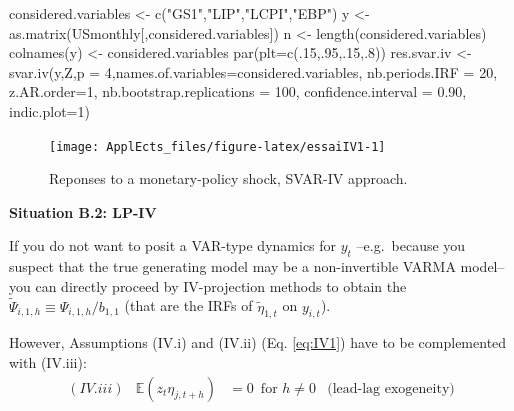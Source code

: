 \documentclass[
  12pt,
]{book}
\newenvironment{Shaded}{\begin{snugshade}}{\end{snugshade}}
\newcommand{\AttributeTok}[1]{\textcolor[rgb]{0.77,0.63,0.00}{#1}}
\newcommand{\DecValTok}[1]{\textcolor[rgb]{0.00,0.00,0.81}{#1}}
\newcommand{\FloatTok}[1]{\textcolor[rgb]{0.00,0.00,0.81}{#1}}
\newcommand{\FunctionTok}[1]{\textcolor[rgb]{0.00,0.00,0.00}{#1}}
\newcommand{\NormalTok}[1]{#1}
\newcommand{\OtherTok}[1]{\textcolor[rgb]{0.56,0.35,0.01}{#1}}
\newcommand{\StringTok}[1]{\textcolor[rgb]{0.31,0.60,0.02}{#1}}
\theoremstyle{definition}
\theoremstyle{definition}
\theoremstyle{definition}
\theoremstyle{definition}
\theoremstyle{remark}
\begin{document}
\begin{Shaded}
\begin{Highlighting}[]
\NormalTok{considered.variables }\OtherTok{\textless{}{-}} \FunctionTok{c}\NormalTok{(}\StringTok{"GS1"}\NormalTok{,}\StringTok{"LIP"}\NormalTok{,}\StringTok{"LCPI"}\NormalTok{,}\StringTok{"EBP"}\NormalTok{)}
\NormalTok{y }\OtherTok{\textless{}{-}} \FunctionTok{as.matrix}\NormalTok{(USmonthly[,considered.variables])}
\NormalTok{n }\OtherTok{\textless{}{-}} \FunctionTok{length}\NormalTok{(considered.variables)}
\FunctionTok{colnames}\NormalTok{(y) }\OtherTok{\textless{}{-}}\NormalTok{ considered.variables}
\FunctionTok{par}\NormalTok{(}\AttributeTok{plt=}\FunctionTok{c}\NormalTok{(.}\DecValTok{15}\NormalTok{,.}\DecValTok{95}\NormalTok{,.}\DecValTok{15}\NormalTok{,.}\DecValTok{8}\NormalTok{))}
\NormalTok{res.svar.iv }\OtherTok{\textless{}{-}} 
  \FunctionTok{svar.iv}\NormalTok{(y,Z,}\AttributeTok{p =} \DecValTok{4}\NormalTok{,}\AttributeTok{names.of.variables=}\NormalTok{considered.variables,}
          \AttributeTok{nb.periods.IRF =} \DecValTok{20}\NormalTok{,}
          \AttributeTok{z.AR.order=}\DecValTok{1}\NormalTok{, }
          \AttributeTok{nb.bootstrap.replications =} \DecValTok{100}\NormalTok{, }
          \AttributeTok{confidence.interval =} \FloatTok{0.90}\NormalTok{,}
          \AttributeTok{indic.plot=}\DecValTok{1}\NormalTok{)}
\end{Highlighting}
\end{Shaded}

\begin{figure}
\texttt{[image: ApplEcts\_files/figure-latex/essaiIV1-1]} \caption{Reponses to a monetary-policy shock, SVAR-IV approach.}\label{fig:essaiIV1}
\end{figure}

\textbf{Situation B.2: LP-IV}

If you do not want to posit a VAR-type dynamics for \(y_t\) --e.g.~because you suspect that the true generating model may be a non-invertible VARMA model-- you can directly proceed by IV-projection methods to obtain the \(\tilde\Psi_{i,1,h}\equiv \Psi_{i,1,h}/b_{1,1}\) (that are the IRFs of \(\tilde\eta_{1,t}\) on \(y_{i,t}\)).

However, Assumptions (IV.i) and (IV.ii) (Eq. \eqref{eq:IV1}) have to be complemented with (IV.iii):
\begin{equation*}
\begin{array}{llll}
(IV.iii) & \mathbb{E}(z_t \eta_{j,t+h}) &= 0 \, \mbox{ for } h \ne 0 & \mbox{(lead-lag exogeneity)}
\end{array}
\end{equation*}
\end{document}
